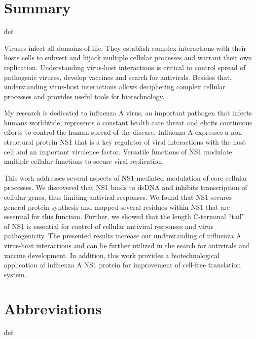 \documentclass[a4paper,12pt]{article} %
\providecommand{\phantomsection}{def} %
\begin{document}

\pagebreak
\section*{Summary}
\phantomsection %

Viruses infect all domains of life. They establish complex interactions with their hosts cells to subvert and hijack multiple cellular processes and warrant their own replication. Understanding virus-host interactions is critical to control spread of pathogenic viruses, develop vaccines and search for antivirals. Besides that, understanding virus-host interactions allows deciphering complex cellular processes and provides useful tools for biotechnology.

My research is dedicated to influenza A virus, an important pathogen that infects humans worldwide, represents a constant health care threat and elicits continuous efforts to control the human spread of the disease. Influenza A expresses a non-structural protein NS1 that is a key regulator of viral interactions with the host cell and an important virulence factor. Versatile functions of NS1 modulate multiple cellular functions to secure viral replication.

This work addresses several aspects of NS1-mediated modulation of core cellular processes. We discovered that NS1 binds to dsDNA and inhibits transcription of cellular genes, thus limiting antiviral responses. We found that NS1 secures general protein synthesis and mapped several residues within NS1 that are essential for this function. Further, we showed that the length C-terminal ``tail'' of NS1 is essential for control of cellular antiviral responses and virus pathogenicity. The presented results increase our understanding of influenza A virus-host interactions and can be further utilized in the search for antivirals and vaccine development. In addition, this work provides a biotechnological application of influenza A NS1 protein for improvement of cell-free translation system.



\pagebreak
\section*{Abbreviations} 
\phantomsection %
\end{document}
